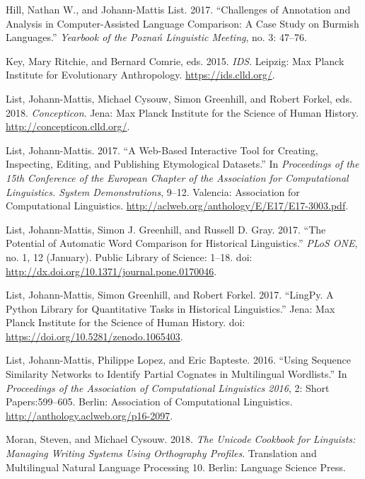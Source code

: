 \documentclass[
  a4paper,
  14pt,
  oneside,
  tablecaptionabove
]{scrbook}
\begin{document}
\nopagebreak\hangindent=0.7cm {\small Hill, Nathan W., and Johann-Mattis List. 2017. \enquote{Challenges of
Annotation and Analysis in Computer-Assisted Language Comparison: A Case
Study on Burmish Languages.} \emph{Yearbook of the Poznań Linguistic
Meeting}, no. 3: 47--76. }

\nopagebreak\hangindent=0.7cm {\small Key, Mary Ritchie, and Bernard Comrie, eds. 2015. \emph{IDS}. 
Leipzig: Max Planck Institute for Evolutionary Anthropology.
\url{https://ids.clld.org/}.  }

\nopagebreak\hangindent=0.7cm {\small List, Johann-Mattis, Michael Cysouw, Simon Greenhill, and Robert
Forkel, eds. 2018. \emph{Concepticon}.  Jena: Max Planck Institute for
the Science of Human History. \url{http://concepticon.clld.org/}.  }

\nopagebreak\hangindent=0.7cm {\small List, Johann-Mattis. 2017. \enquote{A Web-Based Interactive Tool for
Creating, Inspecting, Editing, and Publishing Etymological Datasets.} In
\emph{Proceedings of the 15th Conference of the European Chapter of the
Association for Computational Linguistics. System Demonstrations},
9--12. Valencia: Association for Computational Linguistics.
\url{http://aclweb.org/anthology/E/E17/E17-3003.pdf}.  }

\nopagebreak\hangindent=0.7cm {\small List, Johann-Mattis, Simon J. Greenhill, and Russell D. Gray. 2017.
\enquote{The Potential of Automatic Word Comparison for Historical
Linguistics.} \emph{PLoS ONE}, no. 1, 12 (January). Public Library of
Science: 1--18. doi:
\href{https://doi.org/http://dx.doi.org/10.1371/journal.pone.0170046}{http://dx.doi.org/10.1371/journal.pone.0170046}.
}

\nopagebreak\hangindent=0.7cm {\small List, Johann-Mattis, Simon Greenhill, and Robert Forkel. 2017.
\enquote{LingPy. A Python Library for Quantitative Tasks in Historical
Linguistics.} Jena: Max Planck Institute for the Science of Human
History. doi:
\href{https://doi.org/https://doi.org/10.5281/zenodo.1065403}{https://doi.org/10.5281/zenodo.1065403}.
}

\nopagebreak\hangindent=0.7cm {\small List, Johann-Mattis, Philippe Lopez, and Eric Bapteste. 2016.
\enquote{Using Sequence Similarity Networks to Identify Partial Cognates
in Multilingual Wordlists.} In \emph{Proceedings of the Association of
Computational Linguistics 2016}, 2: Short Papers:599--605. Berlin:
Association of Computational Linguistics.
\url{http://anthology.aclweb.org/p16-2097}.  }

\nopagebreak\hangindent=0.7cm {\small Moran, Steven, and Michael Cysouw. 2018. \emph{The Unicode Cookbook
for Linguists: Managing Writing Systems Using Orthography Profiles}. 
Translation and Multilingual Natural Language Processing 10. Berlin:
Language Science Press. }
\end{document}
